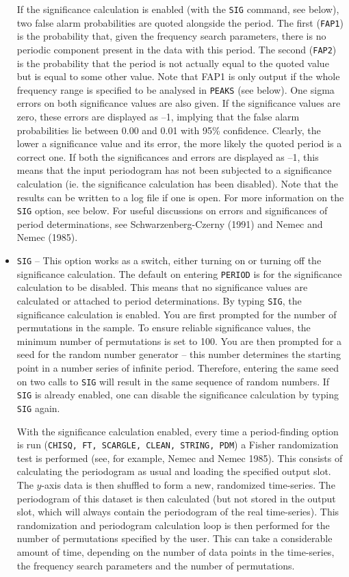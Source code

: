 \documentclass[twoside,11pt,noabs,nolof]{starlink}
\begin{document}
\begin{itemize}
If the significance calculation is enabled (with the \texttt{SIG} command, see
below), two false alarm probabilities are quoted alongside the period. The
first (\texttt{FAP1}) is the probability that, given the frequency search
parameters, there is no periodic component present in the data with this
period. The second (\texttt{FAP2}) is the probability that the period is not
actually equal to the quoted value but is equal to some other value. Note that
FAP1 is only output if the whole frequency range is specified to be analysed in
\texttt{PEAKS} (see below). One sigma errors on both significance values are also
given. If the significance values are zero, these errors are displayed as --1,
implying that the false alarm probabilities lie between 0.00 and 0.01 with 95\%
confidence. Clearly, the lower a significance value and its error, the more
likely the quoted period is a correct one. If both the significances and errors
are displayed as --1, this means that the input periodogram has not been
subjected to a significance calculation (ie. the significance calculation has
been disabled). Note that the results can be written to a log file if one is
open. For more information on the \texttt{SIG} option, see below. For useful
discussions on errors and significances of period determinations, see
Schwarzenberg-Czerny (1991) and Nemec and Nemec (1985).

\item \texttt{SIG} -- This option works as a switch, either turning on or turning
off the significance calculation. The default on entering \texttt{PERIOD} is for
the significance calculation to be disabled. This means that no significance
values are calculated or attached to period determinations. By typing \texttt{SIG}, the significance calculation is enabled. You are first prompted for the
number of permutations in the sample. To ensure reliable significance values,
the minimum number of permutations is set to 100. You are then prompted for a
seed for the random number generator -- this number determines the starting
point in a number series of infinite period. Therefore, entering the same seed
on two calls to \texttt{SIG} will result in the same sequence of random numbers.
If \texttt{SIG} is already enabled, one can disable the significance calculation
by typing \texttt{SIG} again.

With the significance calculation enabled, every time a period-finding option
is run (\texttt{CHISQ, FT, SCARGLE, CLEAN, STRING, PDM}) a Fisher randomization
test is performed (see, for example, Nemec and Nemec 1985). This consists of
calculating the periodogram as usual and loading the specified output slot. The
$y$-axis data is then shuffled to form a new, randomized time-series. The
periodogram of this dataset is then calculated (but not stored in the output
slot, which will always contain the periodogram of the real time-series). This
randomization and periodogram calculation loop is then performed for the number
of permutations specified by the user. This can take a considerable amount of
time, depending on the number of data points in the time-series, the frequency
search parameters and the number of permutations.


\end{itemize}
\end{document}
